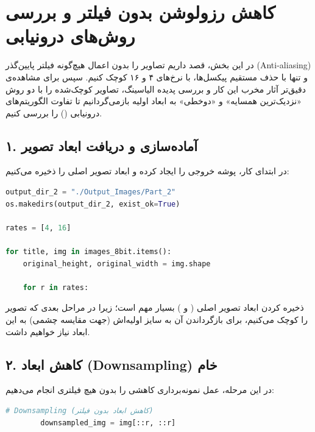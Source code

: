 \section{کاهش رزولوشن بدون فیلتر و بررسی روش‌های درونیابی}

در این بخش، قصد داریم تصاویر را بدون اعمال هیچ‌گونه فیلتر پایین‌گذر (Anti-aliasing) و تنها با حذف مستقیم پیکسل‌ها، با نرخ‌های ۴ و ۱۶ کوچک کنیم. سپس برای مشاهده‌ی دقیق‌تر آثار مخرب این کار و بررسی پدیده الیاسینگ، تصاویر کوچک‌شده را با دو روش «نزدیک‌ترین همسایه» و «دوخطی» به ابعاد اولیه بازمی‌گردانیم تا تفاوت الگوریتم‌های درونیابی () را بررسی کنیم.

\subsection*{۱. آماده‌سازی و دریافت ابعاد تصویر}
در ابتدای کار، پوشه خروجی را ایجاد کرده و ابعاد تصویر اصلی را ذخیره می‌کنیم:

\begin{codebox}
\begin{lstlisting}[language=Python]
output_dir_2 = "./Output_Images/Part_2"
os.makedirs(output_dir_2, exist_ok=True)

rates = [4, 16]

for title, img in images_8bit.items():
    original_height, original_width = img.shape
    
    for r in rates:
\end{lstlisting}
\end{codebox}

ذخیره کردن ابعاد تصویر اصلی ( و ) بسیار مهم است؛ زیرا در مراحل بعدی که تصویر را کوچک می‌کنیم، برای بازگرداندن آن به سایز اولیه‌اش (جهت مقایسه چشمی) به این ابعاد نیاز خواهیم داشت.

\subsection*{۲. کاهش ابعاد (Downsampling) خام}
در این مرحله، عمل نمونه‌برداری کاهشی را بدون هیچ فیلتری انجام می‌دهیم:

\begin{codebox}
\begin{lstlisting}[language=Python]
        # Downsampling (کاهش ابعاد بدون فیلتر)
        downsampled_img = img[::r, ::r]
\end{lstlisting}
\end{codebox}

